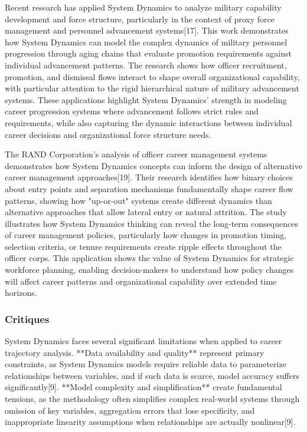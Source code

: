 \documentclass[main.tex]{subfiles}
\begin{document}
Recent research has applied System Dynamics to analyze military capability development and force structure, particularly in the context of proxy force management and personnel advancement systems[17]. This work demonstrates how System Dynamics can model the complex dynamics of military personnel progression through aging chains that evaluate promotion requirements against individual advancement patterns. The research shows how officer recruitment, promotion, and dismissal flows interact to shape overall organizational capability, with particular attention to the rigid hierarchical nature of military advancement systems. These applications highlight System Dynamics' strength in modeling career progression systems where advancement follows strict rules and requirements, while also capturing the dynamic interactions between individual career decisions and organizational force structure needs.


The RAND Corporation's analysis of officer career management systems demonstrates how System Dynamics concepts can inform the design of alternative career management approaches[19]. Their research identifies how binary choices about entry points and separation mechanisms fundamentally shape career flow patterns, showing how "up-or-out" systems create different dynamics than alternative approaches that allow lateral entry or natural attrition. The study illustrates how System Dynamics thinking can reveal the long-term consequences of career management policies, particularly how changes in promotion timing, selection criteria, or tenure requirements create ripple effects throughout the officer corps. This application shows the value of System Dynamics for strategic workforce planning, enabling decision-makers to understand how policy changes will affect career patterns and organizational capability over extended time horizons.

\subsubsection{Critiques}

System Dynamics faces several significant limitations when applied to career trajectory analysis. **Data availability and quality** represent primary constraints, as System Dynamics models require reliable data to parameterize relationships between variables, and if such data is scarce, model accuracy suffers significantly[9]. **Model complexity and simplification** create fundamental tensions, as the methodology often simplifies complex real-world systems through omission of key variables, aggregation errors that lose specificity, and inappropriate linearity assumptions when relationships are actually nonlinear[9].
\end{document}
